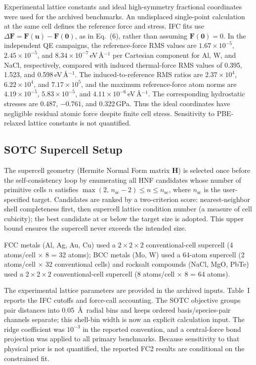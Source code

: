 \documentclass[aps,prb,reprint,amsmath,amssymb,floatfix]{revtex4-2}
\begin{document}
\color{revisionblue}
Experimental lattice constants and ideal high-symmetry fractional coordinates
were used for the archived benchmarks. An undisplaced single-point calculation
at the same cell defines the reference force and stress. IFC fits use
\(\Delta\mathbf F=\mathbf F(\mathbf u)-\mathbf F(\mathbf0)\), as in Eq.~(6),
rather than assuming \(\mathbf F(\mathbf0)=0\). In the independent QE campaigns,
the reference-force RMS values are \(1.67\times10^{-5}\),
\(2.45\times10^{-5}\), and \(8.34\times10^{-7}\)\,eV\,\AA\(^{-1}\) per
Cartesian component for Al, W, and NaCl, respectively, compared with induced
thermal-force RMS values of 0.395, 1.523, and 0.598\,eV\,\AA\(^{-1}\).
The induced-to-reference RMS ratios are \(2.37\times10^4\),
\(6.22\times10^4\), and \(7.17\times10^5\), and the maximum
reference-force atom norms are \(4.19\times10^{-5}\),
\(5.83\times10^{-5}\), and \(4.11\times10^{-6}\)\,eV\,\AA\(^{-1}\).
The corresponding hydrostatic stresses are 0.487, \(-0.761\), and
0.322\,GPa. Thus the ideal coordinates have negligible residual atomic force
despite finite cell stress. Sensitivity to PBE-relaxed lattice constants is not
quantified.
\color{black}

\subsection{SOTC Supercell Setup}\label{sotc-supercell-setup}

The supercell geometry (Hermite Normal Form matrix \(\mathbf{H}\)) is
selected once before the self-consistency loop by enumerating all HNF
candidates whose number of primitive cells \(n\) satisfies
\(\max(2,\,n_\text{sc}-2) \le n \le n_\text{sc}\), where
\(n_\text{sc}\) is the user-specified target. Candidates are ranked by a
two-criterion score: nearest-neighbor shell completeness first, then
supercell lattice condition number (a measure of cell cubicity); the best candidate at or below the
target size is adopted. This upper bound ensures the supercell never
exceeds the intended size.

\color{revisionblue}
FCC metals (Al, Ag, Au, Cu) used a \(2\times2\times2\) conventional-cell
supercell (4 atoms/cell \(\times\) 8 = 32 atoms); BCC metals (Mo, W)
used a 64-atom supercell (2 atoms/cell \(\times\) 32 conventional cells)
and rocksalt compounds (NaCl, MgO, PbTe) used a \(2\times2\times2\)
conventional-cell supercell (8 atoms/cell \(\times\) 8 = 64 atoms).
\color{black}

\color{revisionblue}
The experimental lattice parameters are provided in the archived inputs.
Table~I reports the IFC cutoffs and force-call accounting. The SOTC objective
groups pair distances into 0.05~\AA\ radial bins and keeps ordered
basis/species-pair channels separate; this shell-bin width is now an explicit
calculation input. The ridge coefficient was \(10^{-3}\) in the reported
convention, and a central-force
bond projection was applied to all primary benchmarks. Because sensitivity to
that physical prior is not quantified, the reported FC2 results are conditional
on the constrained fit.
\color{black}
\end{document}
